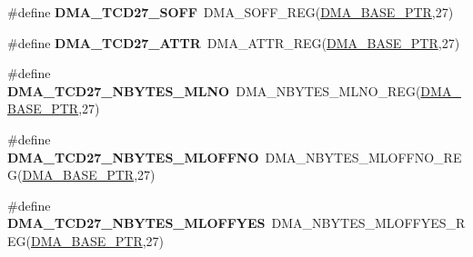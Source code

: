 \begin{DoxyCompactItemize}
\item 
\hypertarget{group___d_m_a___register___accessor___macros_gaff51473797b16b080d2ed771ee570e4b}{}\#define {\bfseries D\+M\+A\+\_\+\+T\+C\+D27\+\_\+\+S\+O\+F\+F}~D\+M\+A\+\_\+\+S\+O\+F\+F\+\_\+\+R\+E\+G(\hyperlink{group___d_m_a___peripheral_ga6997fbc1b1973e9f27170217a3bd6f22}{D\+M\+A\+\_\+\+B\+A\+S\+E\+\_\+\+P\+T\+R},27)\label{group___d_m_a___register___accessor___macros_gaff51473797b16b080d2ed771ee570e4b}

\item 
\hypertarget{group___d_m_a___register___accessor___macros_ga9bfdedfe575b78700e52d27ed60f6997}{}\#define {\bfseries D\+M\+A\+\_\+\+T\+C\+D27\+\_\+\+A\+T\+T\+R}~D\+M\+A\+\_\+\+A\+T\+T\+R\+\_\+\+R\+E\+G(\hyperlink{group___d_m_a___peripheral_ga6997fbc1b1973e9f27170217a3bd6f22}{D\+M\+A\+\_\+\+B\+A\+S\+E\+\_\+\+P\+T\+R},27)\label{group___d_m_a___register___accessor___macros_ga9bfdedfe575b78700e52d27ed60f6997}

\item 
\hypertarget{group___d_m_a___register___accessor___macros_gadb32cf9ec6f05a07c9deeed0cbfbed9b}{}\#define {\bfseries D\+M\+A\+\_\+\+T\+C\+D27\+\_\+\+N\+B\+Y\+T\+E\+S\+\_\+\+M\+L\+N\+O}~D\+M\+A\+\_\+\+N\+B\+Y\+T\+E\+S\+\_\+\+M\+L\+N\+O\+\_\+\+R\+E\+G(\hyperlink{group___d_m_a___peripheral_ga6997fbc1b1973e9f27170217a3bd6f22}{D\+M\+A\+\_\+\+B\+A\+S\+E\+\_\+\+P\+T\+R},27)\label{group___d_m_a___register___accessor___macros_gadb32cf9ec6f05a07c9deeed0cbfbed9b}

\item 
\hypertarget{group___d_m_a___register___accessor___macros_ga68043299f4adac744c480513deb3d169}{}\#define {\bfseries D\+M\+A\+\_\+\+T\+C\+D27\+\_\+\+N\+B\+Y\+T\+E\+S\+\_\+\+M\+L\+O\+F\+F\+N\+O}~D\+M\+A\+\_\+\+N\+B\+Y\+T\+E\+S\+\_\+\+M\+L\+O\+F\+F\+N\+O\+\_\+\+R\+E\+G(\hyperlink{group___d_m_a___peripheral_ga6997fbc1b1973e9f27170217a3bd6f22}{D\+M\+A\+\_\+\+B\+A\+S\+E\+\_\+\+P\+T\+R},27)\label{group___d_m_a___register___accessor___macros_ga68043299f4adac744c480513deb3d169}

\item 
\hypertarget{group___d_m_a___register___accessor___macros_gaee6bdea57ff321bda3e5552e263546bc}{}\#define {\bfseries D\+M\+A\+\_\+\+T\+C\+D27\+\_\+\+N\+B\+Y\+T\+E\+S\+\_\+\+M\+L\+O\+F\+F\+Y\+E\+S}~D\+M\+A\+\_\+\+N\+B\+Y\+T\+E\+S\+\_\+\+M\+L\+O\+F\+F\+Y\+E\+S\+\_\+\+R\+E\+G(\hyperlink{group___d_m_a___peripheral_ga6997fbc1b1973e9f27170217a3bd6f22}{D\+M\+A\+\_\+\+B\+A\+S\+E\+\_\+\+P\+T\+R},27)\label{group___d_m_a___register___accessor___macros_gaee6bdea57ff321bda3e5552e263546bc}


\end{DoxyCompactItemize}
